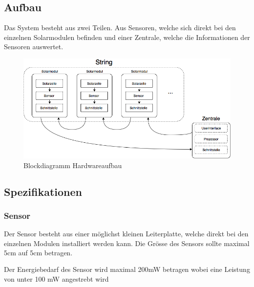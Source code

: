 \subsection{Aufbau}

Das System besteht  aus zwei Teilen. Aus Sensoren, welche sich  direkt bei den
einzelnen Solarmodulen  befinden und einer Zentrale,  welche die Informationen
der Sensoren auswertet.

\begin{figure}[h!]
    \centering
    \includegraphics[width=.9\textwidth]{images/blockdiag.png}
    \caption{Blockdiagramm Hardwareaufbau}
    \label{fig:blockdiag:hardware}
\end{figure}


\subsection{Spezifikationen}


\subsubsection{Sensor}

Der Sensor besteht  aus einer m\"oglichst kleinen  Leiterplatte, welche direkt
bei den  einzelnen Modulen installiert  werden kann. Die Gr\"osse  des Sensors
sollte maximal 5cm auf 5cm betragen.

Der Energiebedarf des  Sensor wird maximal 200mW betragen  wobei eine Leistung
von unter 100 mW angestrebt wird

